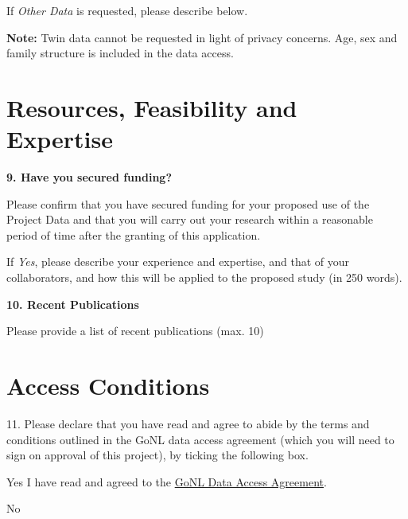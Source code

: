 \documentclass[a4paper,12pt]{article}
\begin{document}
\begin{Form}
If \emph{Other Data} is requested, please describe below.

\TextField[name=otherDataDescription,multiline=true,height=12\baselineskip]{}

\textbf{Note:} Twin data cannot be requested in light of privacy concerns. Age, sex and family structure is included in the data access.

\newpage

\section*{Resources, Feasibility and Expertise}

\textbf{9. Have you secured funding?}

Please confirm that you have secured funding for your proposed use of the Project Data and that you will carry out your research within a reasonable period of time after the granting of this application.

\linebreak
{}

If \emph{Yes}, please describe your experience and expertise, and that of your collaborators, and how this will be applied to the proposed study (in 250 words).

\TextField[name=resourcesExperience,multiline=true,height=10\baselineskip]{}

\textbf{10. Recent Publications}

Please provide a list of recent publications (max. 10)

\TextField[name=publications,multiline=true,height=28\baselineskip]{}

\newpage

\section*{Access Conditions}

11. Please declare that you have read and agree to abide by the terms and conditions outlined in the GoNL data access agreement (which you will need to sign on approval of this project), by ticking the following box.

\ChoiceMenu[name=hasAgreedToAccessConditions,radio,radiosymbol=\ding{52}]{\mbox{}}{\null} Yes I have read and agreed to the \href{https://go-nl.molgeniscloud.org/api/files/aaaac5wx7sgqv6qwh32jd7yaai?alt=media}{GoNL Data Access Agreement}.

\ChoiceMenu[name=hasAgreedToAccessConditions,radio,radiosymbol=\ding{52}]{\mbox{}}{\null} No



\end{Form}
\end{document}
